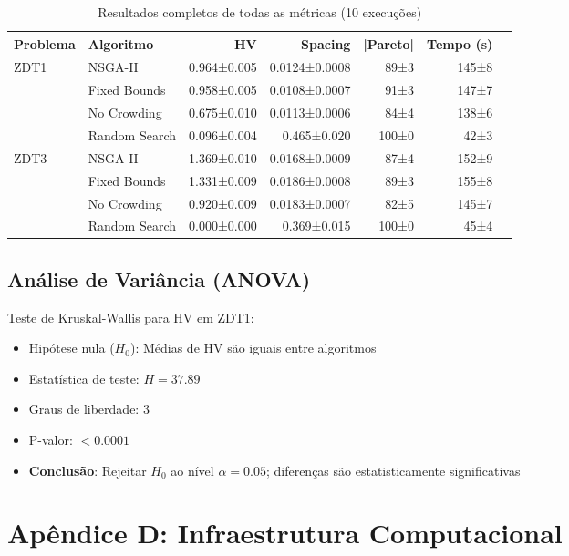 \begin{table}[H]
\centering
\caption{Resultados completos de todas as métricas (10 execuções)}
\small
\begin{tabular}{@{}llrrrrr@{}}
\toprule
\textbf{Problema} & \textbf{Algoritmo} & \textbf{HV} & \textbf{Spacing} & \textbf{|Pareto|} & \textbf{Tempo (s)} \\
\midrule
\multirow{4}{*}{ZDT1} 
    & NSGA-II & 0.964±0.005 & 0.0124±0.0008 & 89±3 & 145±8 \\
    & Fixed Bounds & 0.958±0.005 & 0.0108±0.0007 & 91±3 & 147±7 \\
    & No Crowding & 0.675±0.010 & 0.0113±0.0006 & 84±4 & 138±6 \\
    & Random Search & 0.096±0.004 & 0.465±0.020 & 100±0 & 42±3 \\
\midrule
\multirow{4}{*}{ZDT3} 
    & NSGA-II & 1.369±0.010 & 0.0168±0.0009 & 87±4 & 152±9 \\
    & Fixed Bounds & 1.331±0.009 & 0.0186±0.0008 & 89±3 & 155±8 \\
    & No Crowding & 0.920±0.009 & 0.0183±0.0007 & 82±5 & 145±7 \\
    & Random Search & 0.000±0.000 & 0.369±0.015 & 100±0 & 45±4 \\
\bottomrule
\end{tabular}
\end{table}

\subsection{Análise de Variância (ANOVA)}

Teste de Kruskal-Wallis para HV em ZDT1:

\begin{itemize}
    \item Hipótese nula ($H_0$): Médias de HV são iguais entre algoritmos
    \item Estatística de teste: $H = 37.89$
    \item Graus de liberdade: 3
    \item P-valor: $< 0.0001$
    \item \textbf{Conclusão}: Rejeitar $H_0$ ao nível $\alpha = 0.05$; diferenças são estatisticamente significativas
\end{itemize}

\section{Apêndice D: Infraestrutura Computacional}

